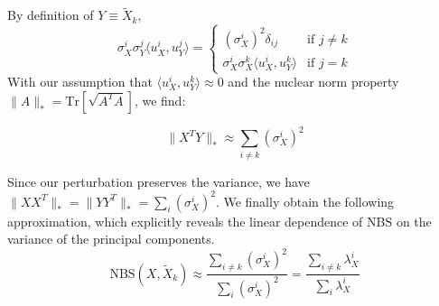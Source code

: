 \documentclass{article} %
\begin{document}
By definition of $Y \equiv \tilde{X}_k$,
$$
\sigma_X^i \sigma_Y^j \langle u_X^i, u_Y^j \rangle = \begin{cases} 
(\sigma_X^i)^2 \delta_{ij} & \text{if } j \neq k \\
\sigma_X^i \sigma_X^k \langle u_X^i, u_Y^k \rangle & \text{if } j = k 
\end{cases}
$$
With our assumption that $\langle u_X^i, u_Y^k \rangle \approx 0$ and the nuclear norm property $\|A\|_* = \text{Tr}\left[ \sqrt{A^T A} \right]$, we find:

$$\|X^TY\|_* \approx \sum_{i \ne k} (\sigma_X^i)^2$$

Since our perturbation preserves the variance, we have $\|XX^T\|_* = \|YY^T\|_* = \sum_i (\sigma_X^i)^2$. We finally obtain the following approximation, which explicitly reveals the linear dependence of NBS on the variance of the principal components.
$$\text{NBS}(X, \tilde{X}_k) \approx \dfrac{\sum_{i \ne k} (\sigma_X^i)^2}{\sum_i (\sigma_X^i)^2} = \dfrac{\sum_{i \ne k} \lambda_X^i}{\sum_i \lambda_X^i}$$










\end{document}
